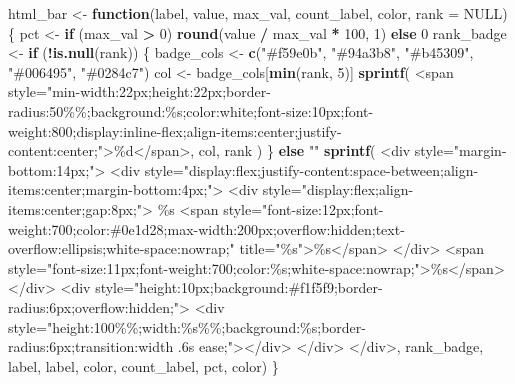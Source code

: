 \documentclass[
]{article}
\newenvironment{Shaded}{\begin{snugshade}}{\end{snugshade}}
\newcommand{\AttributeTok}[1]{\textcolor[rgb]{0.13,0.29,0.53}{#1}}
\newcommand{\ConstantTok}[1]{\textcolor[rgb]{0.56,0.35,0.01}{#1}}
\newcommand{\ControlFlowTok}[1]{\textcolor[rgb]{0.13,0.29,0.53}{\textbf{#1}}}
\newcommand{\DecValTok}[1]{\textcolor[rgb]{0.00,0.00,0.81}{#1}}
\newcommand{\FunctionTok}[1]{\textcolor[rgb]{0.13,0.29,0.53}{\textbf{#1}}}
\newcommand{\NormalTok}[1]{#1}
\newcommand{\OtherTok}[1]{\textcolor[rgb]{0.56,0.35,0.01}{#1}}
\newcommand{\SpecialCharTok}[1]{\textcolor[rgb]{0.81,0.36,0.00}{\textbf{#1}}}
\newcommand{\StringTok}[1]{\textcolor[rgb]{0.31,0.60,0.02}{#1}}
\begin{document}
\begin{Shaded}
\begin{Highlighting}[]
\NormalTok{html\_bar }\OtherTok{\textless{}{-}} \ControlFlowTok{function}\NormalTok{(label, value, max\_val, count\_label, color, }\AttributeTok{rank =} \ConstantTok{NULL}\NormalTok{) \{}
\NormalTok{  pct }\OtherTok{\textless{}{-}} \ControlFlowTok{if}\NormalTok{ (max\_val }\SpecialCharTok{\textgreater{}} \DecValTok{0}\NormalTok{) }\FunctionTok{round}\NormalTok{(value }\SpecialCharTok{/}\NormalTok{ max\_val }\SpecialCharTok{*} \DecValTok{100}\NormalTok{, }\DecValTok{1}\NormalTok{) }\ControlFlowTok{else} \DecValTok{0}
\NormalTok{  rank\_badge }\OtherTok{\textless{}{-}} \ControlFlowTok{if}\NormalTok{ (}\SpecialCharTok{!}\FunctionTok{is.null}\NormalTok{(rank)) \{}
\NormalTok{    badge\_cols }\OtherTok{\textless{}{-}} \FunctionTok{c}\NormalTok{(}\StringTok{"\#f59e0b"}\NormalTok{, }\StringTok{"\#94a3b8"}\NormalTok{, }\StringTok{"\#b45309"}\NormalTok{, }\StringTok{"\#006495"}\NormalTok{, }\StringTok{"\#0284c7"}\NormalTok{)}
\NormalTok{    col }\OtherTok{\textless{}{-}}\NormalTok{ badge\_cols[}\FunctionTok{min}\NormalTok{(rank, }\DecValTok{5}\NormalTok{)]}
    \FunctionTok{sprintf}\NormalTok{(}
      \StringTok{\textquotesingle{}\textless{}span style="min{-}width:22px;height:22px;border{-}radius:50\%\%;background:\%s;color:white;font{-}size:10px;font{-}weight:800;display:inline{-}flex;align{-}items:center;justify{-}content:center;"\textgreater{}\%d\textless{}/span\textgreater{}\textquotesingle{}}\NormalTok{,}
\NormalTok{      col, rank}
\NormalTok{    )}
\NormalTok{  \} }\ControlFlowTok{else} \StringTok{""}
  \FunctionTok{sprintf}\NormalTok{(}\StringTok{\textquotesingle{}}
\StringTok{\textless{}div style="margin{-}bottom:14px;"\textgreater{}}
\StringTok{  \textless{}div style="display:flex;justify{-}content:space{-}between;align{-}items:center;margin{-}bottom:4px;"\textgreater{}}
\StringTok{    \textless{}div style="display:flex;align{-}items:center;gap:8px;"\textgreater{}}
\StringTok{      \%s}
\StringTok{      \textless{}span style="font{-}size:12px;font{-}weight:700;color:\#0e1d28;max{-}width:200px;overflow:hidden;text{-}overflow:ellipsis;white{-}space:nowrap;" title="\%s"\textgreater{}\%s\textless{}/span\textgreater{}}
\StringTok{    \textless{}/div\textgreater{}}
\StringTok{    \textless{}span style="font{-}size:11px;font{-}weight:700;color:\%s;white{-}space:nowrap;"\textgreater{}\%s\textless{}/span\textgreater{}}
\StringTok{  \textless{}/div\textgreater{}}
\StringTok{  \textless{}div style="height:10px;background:\#f1f5f9;border{-}radius:6px;overflow:hidden;"\textgreater{}}
\StringTok{    \textless{}div style="height:100\%\%;width:\%s\%\%;background:\%s;border{-}radius:6px;transition:width .6s ease;"\textgreater{}\textless{}/div\textgreater{}}
\StringTok{  \textless{}/div\textgreater{}}
\StringTok{\textless{}/div\textgreater{}\textquotesingle{}}\NormalTok{, rank\_badge, label, label, color, count\_label, pct, color)}
\NormalTok{\}}


\end{Highlighting}
\end{Shaded}
\end{document}
